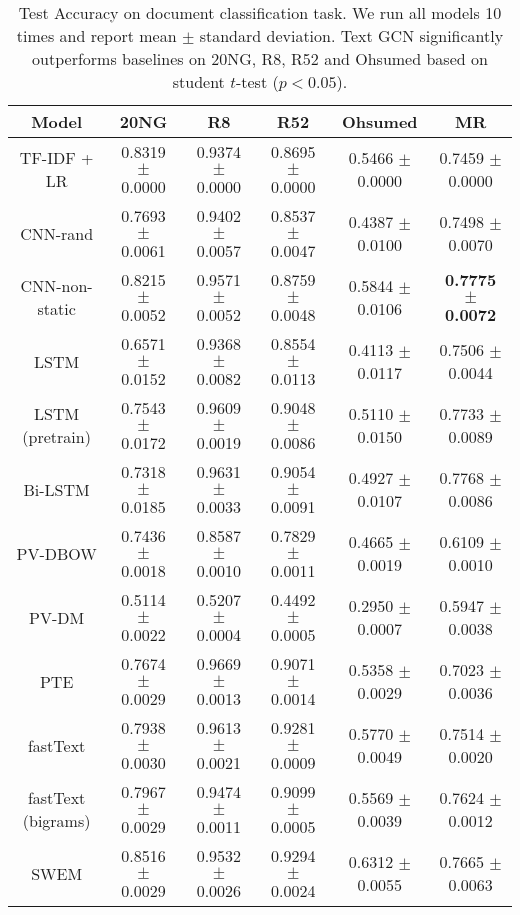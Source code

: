 \documentclass[letterpaper]{article} \usepackage{aaai19}  \usepackage{times}  \usepackage{helvet}  \usepackage{courier}  \usepackage{url}  \usepackage{graphicx}  \frenchspacing  \usepackage{amsmath}
\begin{document}
    \begin{table*}[t]\footnotesize
    \centering
    \renewcommand{\arraystretch}{1.2}
    
    \caption{Test Accuracy on document classification task. We run all models 10 times and report mean $\pm$ standard deviation. Text GCN significantly outperforms baselines on 20NG, R8, R52 and Ohsumed based on student $t$-test ($p <0.05$).}
    \begin{tabular}{c|c|c|c|c|c}
    \hline
    \bf{Model}& \bf{20NG}	& \bf{R8}& \bf{R52}& \bf{Ohsumed} & \bf{MR}\\
    \hline
 TF-IDF + LR & 0.8319 $\pm$ 0.0000 & 0.9374 $\pm$ 0.0000 & 0.8695 $\pm$ 0.0000 & 0.5466 $\pm$ 0.0000 & 0.7459 $\pm$ 0.0000 \\
   
     CNN-rand &0.7693 $\pm$ 0.0061&0.9402 $\pm$ 0.0057 & 0.8537 $\pm$ 0.0047 & 0.4387 $\pm$ 0.0100& 0.7498 $\pm$ 0.0070 \\
     CNN-non-static &0.8215 $\pm$ 0.0052& 0.9571 $\pm$ 0.0052& 0.8759 $\pm$ 0.0048 & 0.5844 $\pm$ 0.0106& \bf{0.7775 $\pm$ 0.0072}  \\
    LSTM &0.6571 $\pm$ 0.0152& 0.9368 $\pm$ 0.0082& 0.8554 $\pm$ 0.0113 &0.4113 $\pm$ 0.0117 & 0.7506 $\pm$ 0.0044 \\
    LSTM (pretrain) &0.7543 $\pm$ 0.0172& 0.9609 $\pm$ 0.0019&0.9048 $\pm$ 0.0086 &0.5110 $\pm$ 0.0150 & 0.7733 $\pm$ 0.0089 \\
    Bi-LSTM &0.7318 $\pm$ 0.0185& 0.9631 $\pm$ 0.0033& 0.9054 $\pm$ 0.0091 &0.4927 $\pm$ 0.0107& 0.7768 $\pm$ 0.0086 \\
    PV-DBOW &0.7436 $\pm$ 0.0018& 0.8587 $\pm$ 0.0010& 0.7829 $\pm$ 0.0011 & 0.4665 $\pm$ 0.0019& 0.6109 $\pm$ 0.0010  \\
    PV-DM &0.5114 $\pm$ 0.0022& 0.5207 $\pm$ 0.0004&  0.4492 $\pm$ 0.0005& 0.2950 $\pm$ 0.0007& 0.5947 $\pm$ 0.0038 \\
    PTE & 0.7674 $\pm$ 0.0029&0.9669 $\pm$ 0.0013 & 0.9071 $\pm$ 0.0014 & 0.5358 $\pm$ 0.0029 & 0.7023 $\pm$ 0.0036\\
    fastText &0.7938 $\pm$ 0.0030& 0.9613 $\pm$ 0.0021& 0.9281 $\pm$  0.0009  & 0.5770 $\pm$ 0.0049 &  0.7514 $\pm$ 0.0020\\
    fastText (bigrams) & 0.7967 $\pm$ 0.0029& 0.9474 $\pm$ 0.0011& 0.9099 $\pm$ 0.0005 &0.5569 $\pm$ 0.0039 & 0.7624 $\pm$ 0.0012 \\
    SWEM &0.8516 $\pm$ 0.0029& 0.9532 $\pm$ 0.0026& 0.9294 $\pm$ 0.0024 & 0.6312 $\pm$ 0.0055& 0.7665 $\pm$ 0.0063 \\

\end{tabular}
\end{table*}
\end{document}
